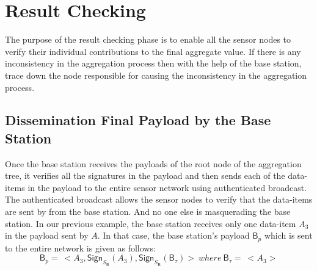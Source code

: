 \section{Result Checking}
	The purpose of the result checking phase is to enable all the sensor nodes to verify their individual contributions to the final aggregate value.
	If there is any inconsistency in the aggregation process then with the help of the base station, trace down the node responsible for causing the inconsistency in the aggregation process.

	\subsection{Dissemination Final Payload by the Base Station}
		Once the base station receives the payloads of the root node of the aggregation tree, it verifies all the signatures in the payload and then sends each of the data-items in the payload to the entire sensor network using authenticated broadcast.
		The authenticated broadcast allows the sensor nodes to verify that the data-items are sent by from the base station. 
		And no one else is masquerading the base station.
		In our previous example, the base station receives only one data-item $A_{3}$ in the payload sent by $A$.
		In that case, the base station's payload $\textsf{B}_{p}$ which is sent to the entire network is given as follows:
 		\begin{equation}
			\textsf{B}_{p} =\ <A_{3}, \textsf{Sign}_{S_{\textsf{B}}}(A_{3}), \textsf{Sign}_{S_{\textsf{B}}}(\textsf{B}_{\tau})>\ where\ \textsf{B}_{\tau} =\ <A_{3}>
		\end{equation}

